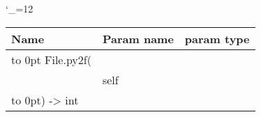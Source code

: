 \begingroup \catcode`\_=12 \tt
\begin{tabular}{lll}
\toprule
\textrm{Name}&\textrm{Param name}&\textrm{param type}\\
\midrule
\hbox to 0pt {File.py2f(\hss}\\
& self\\
\hbox to 0pt{) -> int\hss}\\
\bottomrule
\end{tabular}
\endgroup
